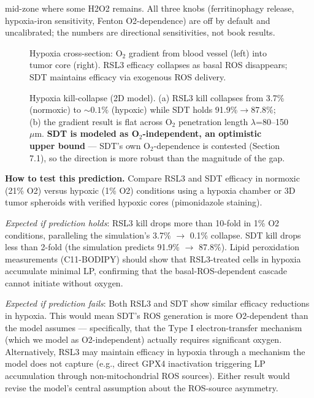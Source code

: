 \documentclass[11pt,twoside,openright]{report}
\begin{document}
mid-zone where some H2O2 remains. All three knobs (ferritinophagy release, hypoxia-iron sensitivity, Fenton O2-dependence) are off by default and uncalibrated; the numbers are directional sensitivities, not book results.

\begin{figure}[tbp]
\setcounter{figure}{14}
\caption{Hypoxia cross-section: O$_2$ gradient from blood vessel (left) into tumor core (right). RSL3 efficacy collapses as basal ROS disappears; SDT maintains efficacy via exogenous ROS delivery.}
\label{fig:fig18_hypoxia_crosssection}
\end{figure}

\begin{figure}[tbp]
\setcounter{figure}{20}
\caption{Hypoxia kill-collapse (2D model). (a) RSL3 kill collapses from 3.7\% (normoxic) to ${\sim}0.1\%$ (hypoxic) while SDT holds 91.9\%${\to}$87.8\%; (b) the gradient result is flat across O$_2$ penetration length $\lambda$=80--150$\mu$m. \textbf{SDT is modeled as O$_2$-independent, an optimistic upper bound} --- SDT's own O$_2$-dependence is contested (Section 7.1), so the direction is more robust than the magnitude of the gap.}
\label{fig:fig24_hypoxia_killcurve}
\end{figure}

\textbf{How to test this prediction.} Compare RSL3 and SDT efficacy in normoxic (21\% O2) versus hypoxic (1\% O2) conditions using a hypoxia chamber or 3D tumor spheroids with verified hypoxic cores (pimonidazole staining).

\textit{Expected if prediction holds}: RSL3 kill drops more than 10-fold in 1\% O2 conditions, paralleling the simulation's 3.7\% $\rightarrow$ 0.1\% collapse. SDT kill drops less than 2-fold (the simulation predicts 91.9\% $\rightarrow$ 87.8\%). Lipid peroxidation measurements (C11-BODIPY) should show that RSL3-treated cells in hypoxia accumulate minimal LP, confirming that the basal-ROS-dependent cascade cannot initiate without oxygen.

\textit{Expected if prediction fails}: Both RSL3 and SDT show similar efficacy reductions in hypoxia. This would mean SDT's ROS generation is more O2-dependent than the model assumes --- specifically, that the Type I electron-transfer mechanism (which we model as O2-independent) actually requires significant oxygen. Alternatively, RSL3 may maintain efficacy in hypoxia through a mechanism the model does not capture (e.g., direct GPX4 inactivation triggering LP accumulation through non-mitochondrial ROS sources). Either result would revise the model's central assumption about the ROS-source asymmetry.
\end{document}
